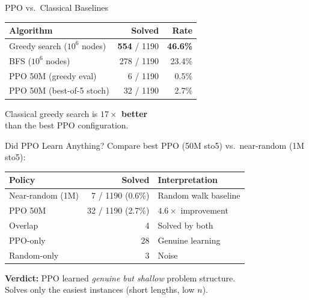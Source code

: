 \documentclass[aspectratio=169,11pt]{beamer}
\begin{document}
\begin{frame}{PPO vs.\ Classical Baselines}
  \begin{center}
  \begin{tabular}{lrr}
    \toprule
    \textbf{Algorithm} & \textbf{Solved} & \textbf{Rate} \\
    \midrule
    Greedy search ($10^6$ nodes)     & \textbf{554} / 1190 & \textcolor{good}{\textbf{46.6\%}} \\
    BFS ($10^6$ nodes)               & 278 / 1190           & 23.4\% \\
    \midrule
    PPO 50M (greedy eval)            & 6 / 1190             & \textcolor{bad}{0.5\%} \\
    PPO 50M (best-of-5 stoch)        & 32 / 1190            & \textcolor{bad}{2.7\%} \\
    \bottomrule
  \end{tabular}
  \end{center}

  \bigskip
  \begin{center}
  \Large
  Classical greedy search is \textcolor{accent}{\textbf{$17\times$ better}}\\
  than the best PPO configuration.
  \end{center}
\end{frame}

\begin{frame}{Did PPO Learn Anything?}
  Compare best PPO (50M sto5) vs.\ near-random (1M sto5):

  \begin{center}
  \begin{tabular}{lrl}
    \toprule
    \textbf{Policy} & \textbf{Solved} & \textbf{Interpretation} \\
    \midrule
    Near-random (1M) & 7 / 1190 (0.6\%) & Random walk baseline \\
    PPO 50M          & 32 / 1190 (2.7\%) & \textcolor{good}{$4.6\times$ improvement} \\
    \midrule
    Overlap          & 4   & Solved by both \\
    PPO-only         & 28  & \textcolor{good}{Genuine learning} \\
    Random-only      & 3   & Noise \\
    \bottomrule
  \end{tabular}
  \end{center}

  \bigskip
  \textbf{Verdict:} PPO learned \textit{genuine but shallow} problem structure.\\
  Solves only the easiest instances (short lengths, low $n$).
\end{frame}
\end{document}
